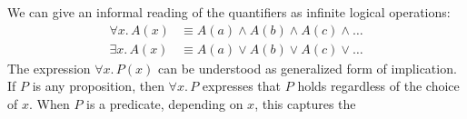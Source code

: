 We can give an informal reading of the quantifiers as infinite logical operations:
\begin{align*}
  \forall x.\,A(x) &
  \equiv A(a) \land A(b) \land A(c) \land \ldots \\
  \exists x.\,A(x) &
  \equiv A(a) \lor A(b) \lor A(c) \lor \ldots
\end{align*}
The expression $\forall x.\, P(x)$ can be understood as  generalized form of implication.
If $P$ is any proposition, then $\forall x.\, P$ expresses that $P$ holds
regardless of the choice of $x$. When $P$ is a predicate, depending on $x$, this captures the
